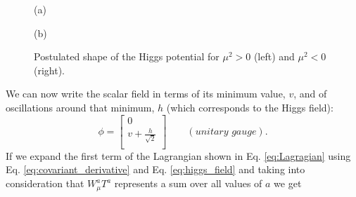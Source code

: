 \begin{figure}
	\begin{minipage}[t]{0.5\textwidth}
		\caption*{(a)}
	\end{minipage}%
	\hfill
	\begin{minipage}[t]{0.5\textwidth}
		\caption*{(b)}
	\end{minipage}
	\caption{Postulated shape of the Higgs potential for $\mu^2>0$ (left) and $\mu^2<0$ (right).}
	\label{fig:higgsV}
\end{figure}

We can now write the scalar field in terms of its minimum value, $v$, and of oscillations around that minimum, $h$ (which corresponds to the Higgs field):
\begin{equation}
\phi = \begin{bmatrix}
0 \\
v+\frac{h}{\sqrt{2}} \\
\end{bmatrix} \qquad (\textit{unitary gauge}).
\label{eq:higgs_field}
\end{equation}
If we expand the first term of the Lagrangian shown in Eq. \ref{eq:Lagragian} using Eq. \ref{eq:covariant_derivative} and Eq. \ref{eq:higgs_field} and taking into consideration that $W^a_{\mu}T^a$ represents a sum over all values of $a$ we get


